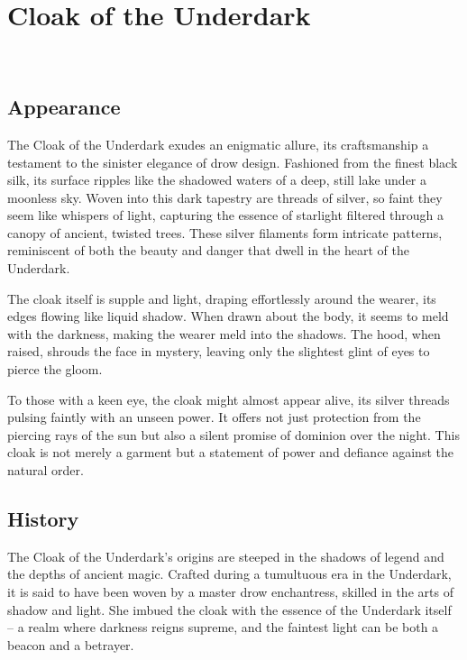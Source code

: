 
\chapter*{Cloak of the Underdark}
\\

\section*{Appearance}
The Cloak of the Underdark exudes an enigmatic allure, its craftsmanship a testament to the sinister elegance of drow design. Fashioned from the finest black silk, its surface ripples like the shadowed waters of a deep, still lake under a moonless sky. Woven into this dark tapestry are threads of silver, so faint they seem like whispers of light, capturing the essence of starlight filtered through a canopy of ancient, twisted trees. These silver filaments form intricate patterns, reminiscent of both the beauty and danger that dwell in the heart of the Underdark.

The cloak itself is supple and light, draping effortlessly around the wearer, its edges flowing like liquid shadow. When drawn about the body, it seems to meld with the darkness, making the wearer meld into the shadows. The hood, when raised, shrouds the face in mystery, leaving only the slightest glint of eyes to pierce the gloom.

To those with a keen eye, the cloak might almost appear alive, its silver threads pulsing faintly with an unseen power. It offers not just protection from the piercing rays of the sun but also a silent promise of dominion over the night. This cloak is not merely a garment but a statement of power and defiance against the natural order.

\section*{History}
The Cloak of the Underdark's origins are steeped in the shadows of legend and the depths of ancient magic. Crafted during a tumultuous era in the Underdark, it is said to have been woven by a master drow enchantress, skilled in the arts of shadow and light. She imbued the cloak with the essence of the Underdark itself – a realm where darkness reigns supreme, and the faintest light can be both a beacon and a betrayer.

